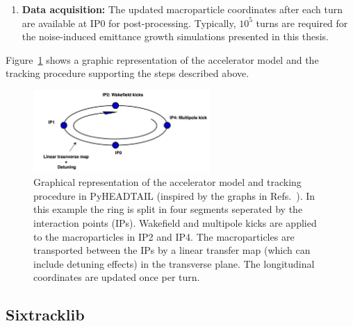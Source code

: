 {\begin{enumerate}
    \item \textbf{Data acquisition:} The updated macroparticle coordinates after each turn are available at IP0 for post-processing. Typically, $10^{5}$ turns are required for the noise-induced emittance growth simulations presented in this thesis. 
    
\end{enumerate}


Figure~\ref{fig:pyheadtail_accelerator_model} shows a graphic representation of the accelerator model and the tracking procedure supporting the steps described above.

\begin{figure}[!h]
    \centering         
    \includegraphics[width=0.6\textwidth]{images/Ch2/accelerator_model_graph_pyheadtail.png}
        \caption{Graphical representation of the accelerator model and tracking procedure in PyHEADTAIL (inspired by the graphs in Refs.~\cite{pyheadtail_schenk, inproceedings_ibs_pyheadtail}). In this example the ring is split in four segments seperated by the interaction points (IPs). Wakefield and multipole kicks are applied to the macroparticles in IP2 and IP4. The macroparticles are transported between the IPs by a linear transfer map (which can include detuning effects) in the transverse plane.  The longitudinal coordinates are updated once per turn.}
        \label{fig:pyheadtail_accelerator_model}
 \end{figure}


\subsection{Sixtracklib}\label{subsec:sixtracklib}

}

